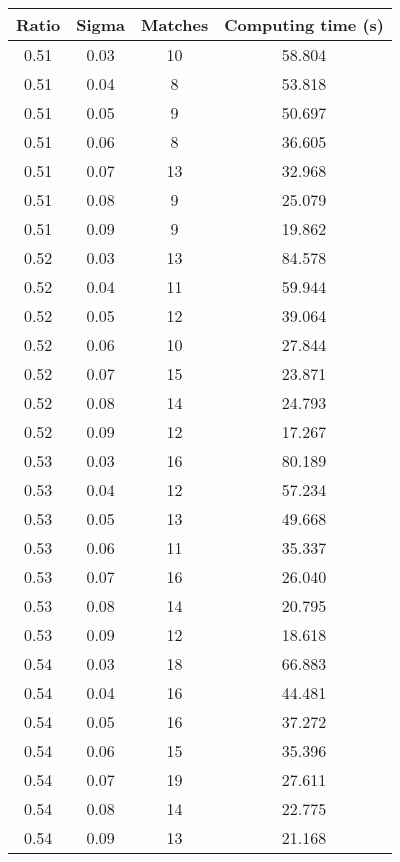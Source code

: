 \documentclass[12pt,letterpaper, onecolumn]{exam}
\begin{document}
\begin{questions}
    \begin{tabular}{|c|c|c|c|}
        \hline
        \textbf{Ratio} & \textbf{Sigma} & \textbf{Matches} & \textbf{Computing time (s)} \\
        \hline
        0.51 & 0.03 & 10 & 58.804 \\
        \hline
        0.51 & 0.04 & 8 & 53.818 \\
        \hline
        0.51 & 0.05 & 9 & 50.697 \\
        \hline
        0.51 & 0.06 & 8 & 36.605 \\
        \hline
        0.51 & 0.07 & 13 & 32.968 \\
        \hline
        0.51 & 0.08 & 9 & 25.079 \\
        \hline
        0.51 & 0.09 & 9 & 19.862 \\
        \hline
        0.52 & 0.03 & 13 & 84.578 \\
        \hline
        0.52 & 0.04 & 11 & 59.944 \\
        \hline
        0.52 & 0.05 & 12 & 39.064 \\
        \hline
        0.52 & 0.06 & 10 & 27.844 \\
        \hline
        0.52 & 0.07 & 15 & 23.871 \\
        \hline
        0.52 & 0.08 & 14 & 24.793 \\
        \hline
        0.52 & 0.09 & 12 & 17.267 \\
        \hline
        0.53 & 0.03 & 16 & 80.189 \\
        \hline
        0.53 & 0.04 & 12 & 57.234 \\
        \hline
        0.53 & 0.05 & 13 & 49.668 \\
        \hline
        0.53 & 0.06 & 11 & 35.337 \\
        \hline
        0.53 & 0.07 & 16 & 26.040 \\
        \hline
        0.53 & 0.08 & 14 & 20.795 \\
        \hline
        0.53 & 0.09 & 12 & 18.618 \\
        \hline
        0.54 & 0.03 & 18 & 66.883 \\
        \hline
        0.54 & 0.04 & 16 & 44.481 \\
        \hline
        0.54 & 0.05 & 16 & 37.272 \\
        \hline
        0.54 & 0.06 & 15 & 35.396 \\
        \hline
        0.54 & 0.07 & 19 & 27.611 \\
        \hline
        0.54 & 0.08 & 14 & 22.775 \\
        \hline
        0.54 & 0.09 & 13 & 21.168 \\
        \hline
    \end{tabular}
    
\end{questions}
\end{document}

